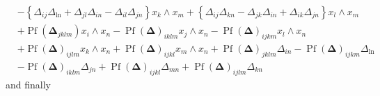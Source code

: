\documentclass[aps, preprint]{revtex4}
\begin{document}
\begin{align}
 &  -\left \{ \Delta _{i j} \Delta _{\ln } +  \Delta _{j l} \Delta _{i n} -  \Delta _{i l} \Delta _{j n}\right \} x_{k} \wedge x_{m} +\left \{ \Delta _{i j} \Delta _{k n} -  \Delta _{j k} \Delta _{i n} +  \Delta _{i k} \Delta _{j n}\right \} x_{l} \wedge x_{m} \nonumber  \\
 &  +\ensuremath{\operatorname*{Pf}} \left (\mathbf{\Delta }_{j k l m}\right ) x_{i} \wedge x_{n} -\ensuremath{\operatorname*{Pf}} \left (\mathbf{\Delta }\right )_{i k l m} x_{j} \wedge x_{n} -\ensuremath{\operatorname*{Pf}} \left (\mathbf{\Delta }\right )_{i j k m} x_{l} \wedge x_{n} \nonumber  \\
 &  +\ensuremath{\operatorname*{Pf}} \left (\mathbf{\Delta }\right )_{i j l m} x_{k} \wedge x_{n} +\ensuremath{\operatorname*{Pf}} \left (\mathbf{\Delta }\right )_{i j k l} x_{m} \wedge x_{n} +\ensuremath{\operatorname*{Pf}} \left (\mathbf{\Delta }\right )_{j k l m}  \Delta _{i n} -\ensuremath{\operatorname*{Pf}} \left (\mathbf{\Delta }\right )_{i j k m} \Delta _{\ln } \nonumber  \\
 &  -\ensuremath{\operatorname*{Pf}} \left (\mathbf{\Delta }\right )_{i k l m}  \Delta _{j n} +\ensuremath{\operatorname*{Pf}} \left (\mathbf{\Delta }\right )_{i j k l}  \Delta _{m n} +\ensuremath{\operatorname*{Pf}} \left (\mathbf{\Delta }\right )_{i j l m} \Delta _{k n}\end{align}and finally
\end{document}
